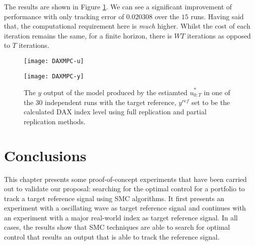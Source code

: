 The results are shown in Figure \ref{fig:mpc}. We can see a significant improvement of performance with only tracking error of $0.020308$ over the $15$ runs. Having said that, the computational requirement here is \emph{much} higher. Whilst the cost of each iteration remains the same, for a finite horizon, there is $WT$ iterations as opposed to $T$ iterations.
 
\begin{figure}[htbp]
\centering
    \begin{minipage}{0.5\textwidth}
        \centering
        \texttt{[image: DAXMPC-u]}
    \end{minipage}%
    \begin{minipage}{0.5\textwidth}
        \centering
        \texttt{[image: DAXMPC-y]}
    \end{minipage}
\caption{The $y$ output of the model produced by the estiamted $\hat{u}^*_{0:T}$ in one of the 30 independent runs with the target reference, $y^{ref}$ set to be the calculated DAX index level using full replication and partial replication methods.}
\label{fig:mpc}
\end{figure}

\section{Conclusions}
\label{sec:conclusion5}
This chapter presents some proof-of-concept experiments that have been
carried out to validate our proposal: searching for the optimal control for a portfolio to track a target reference signal using SMC algorithms. It first presents an experiment with a oscillating wave as target reference signal and continues with an experiment with a major real-world index as target reference signal. In all cases, the results show that SMC techniques are able to search for optimal control that results an output that is able to track the reference signal.
